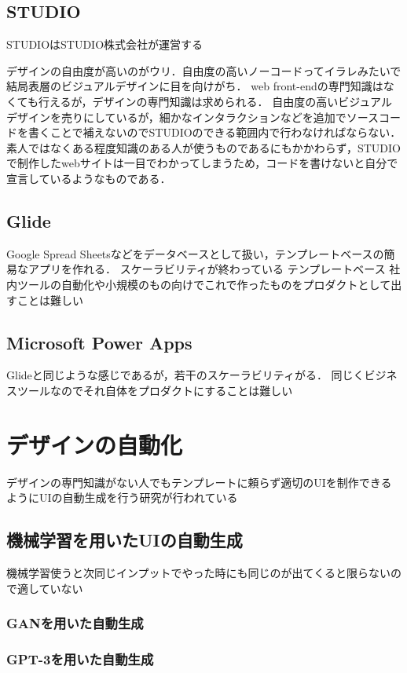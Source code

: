 \subsection{STUDIO}
STUDIOはSTUDIO株式会社が運営する

デザインの自由度が高いのがウリ．自由度の高いノーコードってイラレみたいで結局表層のビジュアルデザインに目を向けがち．
web front-endの専門知識はなくても行えるが，デザインの専門知識は求められる．
自由度の高いビジュアルデザインを売りにしているが，細かなインタラクションなどを追加でソースコードを書くことで補えないのでSTUDIOのできる範囲内で行わなければならない．
素人ではなくある程度知識のある人が使うものであるにもかかわらず，STUDIOで制作したwebサイトは一目でわかってしまうため，コードを書けないと自分で宣言しているようなものである．

\subsection{Glide}
Google Spread Sheetsなどをデータベースとして扱い，テンプレートベースの簡易なアプリを作れる．
スケーラビリティが終わっている
テンプレートベース
社内ツールの自動化や小規模のもの向けでこれで作ったものをプロダクトとして出すことは難しい


\subsection{Microsoft Power Apps}
Glideと同じような感じであるが，若干のスケーラビリティがる．
同じくビジネスツールなのでそれ自体をプロダクトにすることは難しい

\section{デザインの自動化}
デザインの専門知識がない人でもテンプレートに頼らず適切のUIを制作できるようにUIの自動生成を行う研究が行われている
\subsection{機械学習を用いたUIの自動生成}
機械学習使うと次同じインプットでやった時にも同じのが出てくると限らないので適していない
\subsubsection{GANを用いた自動生成}
\cite{2021guigan}
\subsubsection{GPT-3を用いた自動生成}
\cite{text2app}
